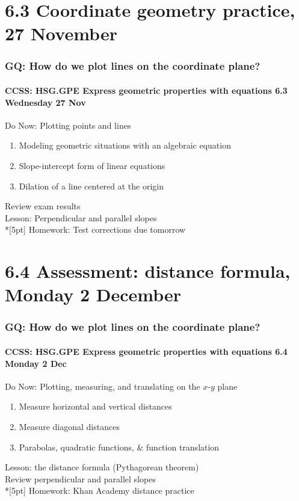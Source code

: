 \documentclass{beamer}
\begin{document}
\section{6.3 Coordinate geometry practice, 27 November}
  \frame
  {
    \frametitle{GQ: How do we plot lines on the coordinate plane?}
    \framesubtitle{CCSS: HSG.GPE Express geometric properties with equations \hfill \alert{6.3 Wednesday 27 Nov}}

    \begin{block}{Do Now: Plotting points and lines}
    \begin{enumerate}
      \item Modeling geometric situations with an algebraic equation
      \item Slope-intercept form of linear equations
      \item Dilation of a line centered at the origin
    \end{enumerate}
    \end{block}
    Review exam results \\
    Lesson: Perpendicular and parallel slopes \\*[5pt]
    Homework: Test corrections due \alert{tomorrow}
  }

\section{6.4 Assessment: distance formula, Monday 2 December}
\frame
{
  \frametitle{GQ: How do we plot lines on the coordinate plane?}
  \framesubtitle{CCSS: HSG.GPE Express geometric properties with equations \hfill \alert{6.4 Monday 2 Dec}}

  \begin{block}{Do Now: Plotting, measuring, and translating on the $x$-$y$ plane}
  \begin{enumerate}
    \item Measure horizontal and vertical distances
    \item Measure diagonal distances
    \item Parabolas, quadratic functions, \& function translation
  \end{enumerate}
  \end{block}
  Lesson: the distance formula (Pythagorean theorem)\\
  Review perpendicular and parallel slopes  \\*[5pt]
  Homework: Khan Academy distance practice
}
\end{document}
